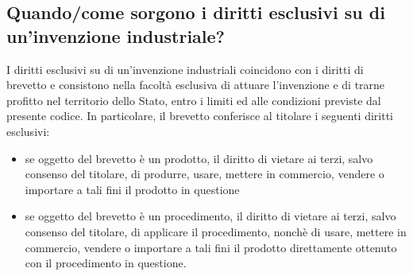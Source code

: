 \subsection{Quando/come sorgono i diritti esclusivi su di un'invenzione industriale?}
I diritti esclusivi su di un'invenzione industriali coincidono con i diritti di brevetto e consistono nella facoltà esclusiva di
attuare l'invenzione e di trarne profitto nel territorio dello Stato, entro i limiti ed alle condizioni previste dal presente codice.\newline
In particolare, il brevetto conferisce al titolare i seguenti diritti esclusivi:
\begin{itemize}
    \item se oggetto del brevetto è un prodotto, il diritto di vietare ai terzi, salvo consenso del titolare, di produrre, usare, mettere in commercio,
    vendere o importare a tali fini il prodotto in questione
    \item se oggetto del brevetto è un procedimento, il diritto di vietare ai terzi, salvo consenso del titolare, di applicare il procedimento, nonchè di usare,
    mettere in commercio, vendere o importare a tali fini il prodotto direttamente ottenuto con il procedimento in questione.
\end{itemize}

